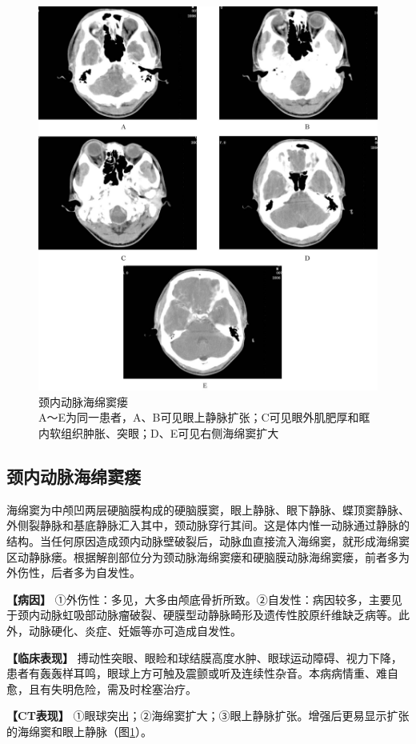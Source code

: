 \begin{figure}[!htbp]
 \centering
 \includegraphics[width=.7\textwidth,height=\textheight,keepaspectratio]{./images/Image00107.jpg}
 \captionsetup{justification=centering}
 \caption{颈内动脉海绵窦瘘\\{\small A～E为同一患者，A、B可见眼上静脉扩张；C可见眼外肌肥厚和眶内软组织肿胀、突眼；D、E可见右侧海绵窦扩大}}
 \label{fig3-8}
  \end{figure} 

\subsection{颈内动脉海绵窦瘘}

海绵窦为中颅凹两层硬脑膜构成的硬脑膜窦，眼上静脉、眼下静脉、蝶顶窦静脉、外侧裂静脉和基底静脉汇入其中，颈动脉穿行其间。这是体内惟一动脉通过静脉的结构。当任何原因造成颈内动脉壁破裂后，动脉血直接流入海绵窦，就形成海绵窦区动静脉瘘。根据解剖部位分为颈动脉海绵窦瘘和硬脑膜动脉海绵窦瘘，前者多为外伤性，后者多为自发性。

\textbf{【病因】}
①外伤性：多见，大多由颅底骨折所致。②自发性：病因较多，主要见于颈内动脉虹吸部动脉瘤破裂、硬膜型动静脉畸形及遗传性胶原纤维缺乏病等。此外，动脉硬化、炎症、妊娠等亦可造成自发性。

\textbf{【临床表现】}
搏动性突眼、眼睑和球结膜高度水肿、眼球运动障碍、视力下降，患者有轰轰样耳鸣，眼球上方可触及震颤或听及连续性杂音。本病病情重、难自愈，且有失明危险，需及时栓塞治疗。

\textbf{【CT表现】}
①眼球突出；②海绵窦扩大；③眼上静脉扩张。增强后更易显示扩张的海绵窦和眼上静脉（图\ref{fig3-8}）。

